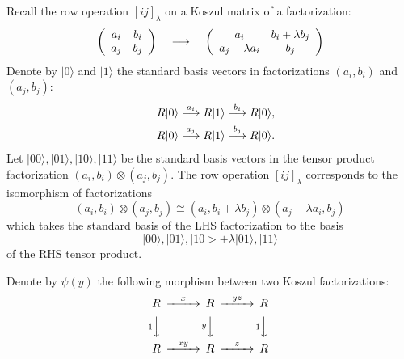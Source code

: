 \documentclass[12pt]{article}
\begin{document}
Recall the row operation $[ij]_{\lambda}$ on a Koszul matrix 
of a factorization: 
$$\left( \begin{array}{cc} a_i & b_i \\ a_j & b_j \end{array} \right) 
 \hspace{0.15in} \longrightarrow \hspace{0.15in} 
 \left( \begin{array}{cc} a_i & b_i+\lambda b_j \\ a_j-\lambda 
 a_i & b_j \end{array} \right)$$
Denote by $|0\rangle$ and $|1\rangle$ the standard basis vectors 
in factorizations 
$(a_i, b_i)$ and $(a_j, b_j)$: 
\begin{eqnarray*} & & R|0\rangle \stackrel{a_i}{\longrightarrow} R|1 \rangle 
 \stackrel{b_i}{\longrightarrow} R|0\rangle , \\
 & & R|0\rangle \stackrel{a_j}{\longrightarrow} R|1 \rangle 
 \stackrel{b_j}{\longrightarrow} R|0\rangle. 
\end{eqnarray*} 
Let $|00\rangle, |01\rangle, |10\rangle, |11\rangle$ be the standard basis 
vectors in the tensor product factorization $(a_i,b_i)\otimes (a_j,b_j).$ 
The row operation $[ij]_{\lambda}$ corresponds to the isomorphism of 
factorizations 
$$ (a_i,b_i)\otimes (a_j,b_j) \cong (a_i , b_i + \lambda b_j) \otimes 
  (a_j -\lambda a_i, b_j)$$ 
which takes the standard basis of the LHS factorization to the basis  
$$ |00\rangle, |01\rangle, |10> + \lambda |01\rangle, |11\rangle$$ 
of the RHS tensor product. 

Denote by $\psi(y)$ the following morphism between two Koszul factorizations: 
  \begin{equation*}
   \begin{CD}
     R @>{x}>> R @>{yz}>> R  \\
     @V{1}VV      @V{y}VV   @V{1}VV \\
     R @>{xy}>> R @>{z}>> R
   \end{CD}
 \end{equation*}
\end{document}
